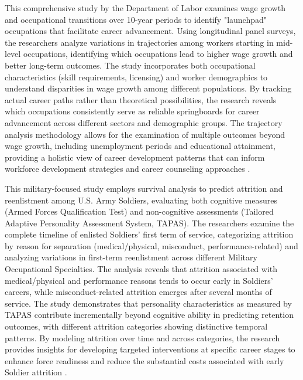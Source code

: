 \documentclass[../main.tex]{subfiles}
\begin{document}
This comprehensive study by the Department of Labor examines wage growth and occupational transitions over 10-year periods to identify "launchpad" occupations that facilitate career advancement. Using longitudinal panel surveys, the researchers analyze variations in trajectories among workers starting in mid-level occupations, identifying which occupations lead to higher wage growth and better long-term outcomes. The study incorporates both occupational characteristics (skill requirements, licensing) and worker demographics to understand disparities in wage growth among different populations. By tracking actual career paths rather than theoretical possibilities, the research reveals which occupations consistently serve as reliable springboards for career advancement across different sectors and demographic groups. The trajectory analysis methodology allows for the examination of multiple outcomes beyond wage growth, including unemployment periods and educational attainment, providing a holistic view of career development patterns that can inform workforce development strategies and career counseling approaches \parencite{dol2023career}.

This military-focused study employs survival analysis to predict attrition and reenlistment among U.S. Army Soldiers, evaluating both cognitive measures (Armed Forces Qualification Test) and non-cognitive assessments (Tailored Adaptive Personality Assessment System, TAPAS). The researchers examine the complete timeline of enlisted Soldiers' first term of service, categorizing attrition by reason for separation (medical/physical, misconduct, performance-related) and analyzing variations in first-term reenlistment across different Military Occupational Specialties. The analysis reveals that attrition associated with medical/physical and performance reasons tends to occur early in Soldiers' careers, while misconduct-related attrition emerges after several months of service. The study demonstrates that personality characteristics as measured by TAPAS contribute incrementally beyond cognitive ability in predicting retention outcomes, with different attrition categories showing distinctive temporal patterns. By modeling attrition over time and across categories, the research provides insights for developing targeted interventions at specific career stages to enhance force readiness and reduce the substantial costs associated with early Soldier attrition \parencite{niessen2016attrition}.
\end{document}
